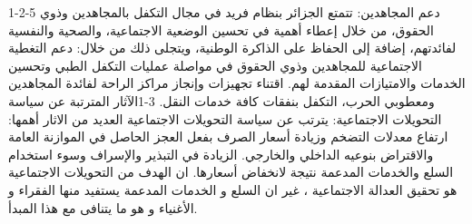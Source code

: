 \documentclass[12pt,a4paper]{report}
\begin{document}
1-2-5 دعم المجاهدين: تتمتع الجزائر بنظام فريد في مجال التكفل بالمجاهدين وذوي الحقوق، من خلال إعطاء أهمية في تحسين الوضعية الاجتماعية، والصحية والنفسية لفائدتهم، إضافة إلى الحفاظ على الذاكرة الوطنية، ويتجلى ذلك من خلال:
دعم التغطية الاجتماعية للمجاهدين وذوي الحقوق في مواصلة عمليات التكفل الطبي وتحسين الخدمات والامتيازات المقدمة لهم.
﻿﻿اقتناء تجهيزات وإنجاز مراكز الراحة لفائدة المجاهدين ومعطوبي الحرب، التكفل بنفقات كافة خدمات النقل.
3-1الآثار المترتبة عن سياسة التحويلات الاجتماعية:
 يترتب عن سياسة التحويلات الاجتماعية العديد من الاثار أهمها: 
ارتفاع معدلات التضخم وزيادة أسعار الصرف بفعل العجز الحاصل في الموازنة العامة والاقتراض بنوعيه الداخلي والخارجي.
الزيادة في التبذير والإسراف وسوء استخدام السلع والخدمات المدعمة نتيجة لانخفاض أسعارها.
ان الهدف من التحويلات الاجتماعية هو تحقيق العدالة الاجتماعية ، غير ان السلع و الخدمات المدعمة يستفيد منها الفقراء و الأغنياء و هو ما يتنافى مع هذا المبدأ.
\end{document}
